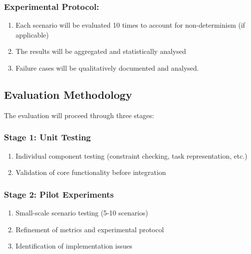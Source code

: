 \documentclass[12pt]{article}
\begin{document}
\subsubsection{Experimental Protocol:}
\begin{enumerate}
    \item Each scenario will be evaluated 10 times to account for non-determinism (if applicable)
    \item  The results will be aggregated and statistically analysed
    \item Failure cases will be qualitatively documented and analysed.
\end{enumerate}
\subsection{Evaluation Methodology}

The evaluation will proceed through three stages:

\subsubsection{Stage 1: Unit Testing}
\begin{enumerate}
    \item Individual component testing (constraint checking, task representation, etc.)
    \item Validation of core functionality before integration
\end{enumerate}
\subsubsection{Stage 2: Pilot Experiments}
\begin{enumerate}
    \item Small-scale scenario testing (5-10 scenarios)
    \item Refinement of metrics and experimental protocol
    \item Identification of implementation issues
\end{enumerate}
\end{document}
